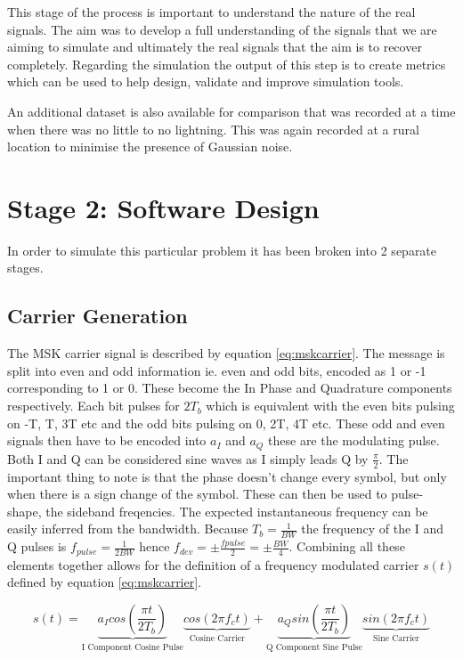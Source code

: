 This stage of the process is important to understand the nature of the real signals. The aim was to develop a full understanding of the signals that we are aiming to simulate and ultimately the real signals that the aim is to recover completely. Regarding the simulation the output of this step is to create metrics which can be used to help design, validate and improve simulation tools.

An additional dataset is also available for comparison that was recorded at a time when there was no little to no lightning. This was again recorded at a rural location to minimise the presence of Gaussian noise.

\section{Stage 2: Software Design}
In order to simulate this particular problem it has been broken into 2 separate stages.
\subsection{Carrier Generation}
The MSK carrier signal is described by equation \ref{eq:mskcarrier}. The message is split into even and odd information ie. even and odd bits, encoded as 1 or -1 corresponding to 1 or 0. These become the In Phase and Quadrature components respectively. Each bit pulses for $2T_b$ which is equivalent with the even bits pulsing on -T, T, 3T etc and the odd bits pulsing on 0, 2T, 4T etc. These odd and even signals then have to be encoded into $a_I$ and $a_Q$ these are the modulating pulse. Both I and Q can be considered sine waves as I simply leads Q by $\frac{\pi}{2}$. The important thing to note is that the phase doesn't change every symbol, but only when there is a sign change of the symbol.
These can then be used to pulse-shape, the sideband freqencies. The expected instantaneous frequency can be easily inferred from the bandwidth. Because $T_b = \frac{1}{BW}$ the frequency of the I and Q pulses is $f_{pulse} = \frac{1}{2BW}$ hence $f_{dev} = \pm\frac{f{pulse}}{2}=\pm\frac{BW}{4}$. Combining all these elements together allows for the definition of a frequency modulated carrier $s(t)$ defined by equation \ref{eq:mskcarrier}.


\begin{equation}
s(t) = \underbrace{a_I cos\left(\frac{\pi t}{2T_b}\right)}_{\text{I Component Cosine Pulse}}\underbrace{cos(2\pi f_ct)}_{\text{Cosine Carrier}} + \underbrace{a_Qsin\left(\frac{\pi t}{2T_b}\right)}_{\text{Q Component Sine Pulse}}\underbrace{sin(2\pi f_ct)}_{\text{Sine Carrier}}
\label{eq:mskcarrier}
\end{equation}

